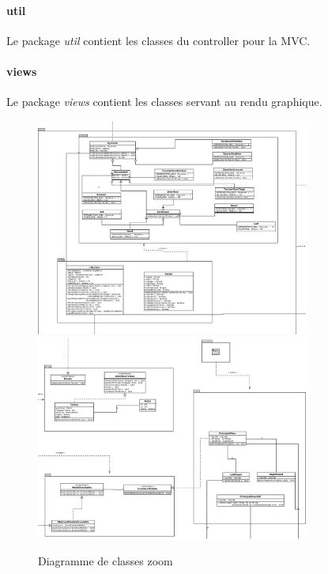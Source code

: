 \documentclass[12pt]{article}
\begin{document}
\paragraph{util}
Le package \textit{util} contient les classes du controller pour la MVC.
\paragraph{views}
Le package \textit{views} contient les classes servant au rendu graphique.
\begin{figure}[!h]
	\center
	\includegraphics[width=0.8\textwidth]{./images/DiagrammeLSystemGauche.png}
	\includegraphics[width=0.8\textwidth]{./images/DiagrammeLSystemRight.png}
	\caption{Diagramme de classes zoom\label{fig:figure3}}
\end{figure}
 
\end{document}
